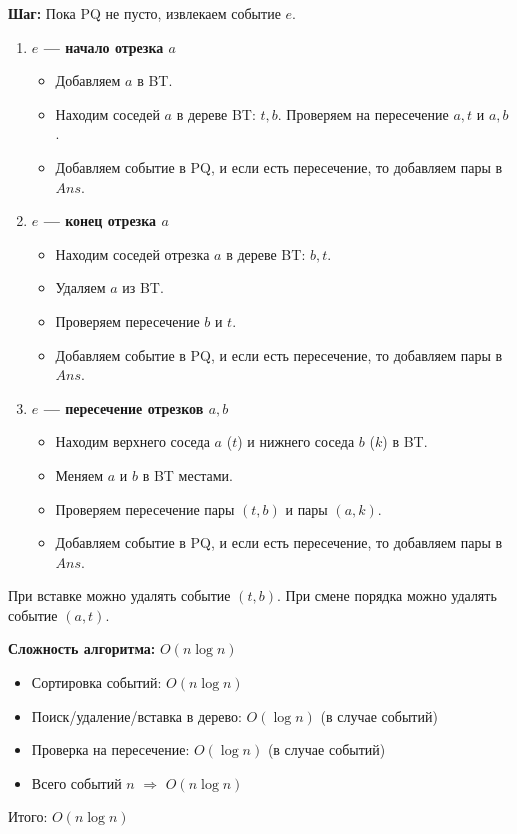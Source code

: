 \textbf{Шаг:} Пока PQ не пусто, извлекаем событие $e$. 

\begin{enumerate}[label=\arabic*.]
	\item \textbf{$e$ --- начало отрезка $a$} 
	\begin{itemize}
		\item Добавляем $a$ в BT. 
		\item Находим соседей $a$ в дереве BT: $t, b$. Проверяем на пересечение $a, t$ и $a, b$. 
		\item Добавляем событие в PQ, и если есть пересечение, то добавляем пары в $Ans$. 
	\end{itemize}
	\item \textbf{$e$ --- конец отрезка $a$} 
	\begin{itemize}
		\item Находим соседей отрезка $a$ в дереве BT: $b, t$. 
		\item Удаляем $a$ из BT. 
		\item Проверяем пересечение $b$ и $t$. 
		\item Добавляем событие в PQ, и если есть пересечение, то добавляем пары в $Ans$. 
	\end{itemize}
	\item \textbf{$e$ --- пересечение отрезков $a, b$} 
	\begin{itemize}
		\item Находим верхнего соседа $a$ ($t$) и нижнего соседа $b$ ($k$) в BT. 
		\item Меняем $a$ и $b$ в BT местами. 
		\item Проверяем пересечение пары $(t, b)$ и пары $(a, k)$. 
		\item Добавляем событие в PQ, и если есть пересечение, то добавляем пары в $Ans$. 
	\end{itemize}
\end{enumerate}
При вставке можно удалять событие $(t, b)$. 
При смене порядка можно удалять событие $(a, t)$. 

\textbf{Сложность алгоритма:} $O(n \log n)$ 
\begin{itemize}
	\item Сортировка событий: $O(n \log n)$ 
	\item Поиск/удаление/вставка в дерево: $O(\log n)$ (в случае событий) 
	\item Проверка на пересечение: $O(\log n)$ (в случае событий) 
	\item Всего событий $n$ $\Rightarrow$ $O(n \log n)$
\end{itemize}
Итого: $O(n \log n)$ 
